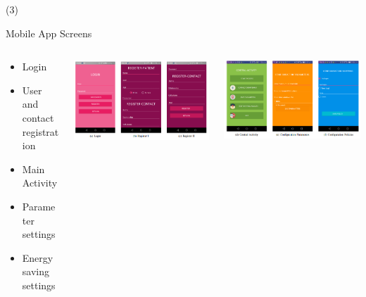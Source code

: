 \begin{frame}{ (3)}
\begin{block}{Mobile App Screens}
\begin{columns}
\begin{column}{0.24\textwidth}
\begin{itemize}
\item Login
\item User and contact registration
\item Main Activity
\item Parameter settings
\item Energy saving settings
\end{itemize}
\end{column}
\begin{column}{0.39\textwidth}
    \begin{center}
         \includegraphics[width=1.0\textwidth]{Figs/Dementia_modulosA}
     \end{center}
     \end{column}
     \begin{column}{0.39\textwidth}
    \begin{center}
         \includegraphics[width=1.0\textwidth]{Figs/Dementia_modulosB}
     \end{center}
     

\end{column}
\end{columns}
\end{block}
\end{frame}

